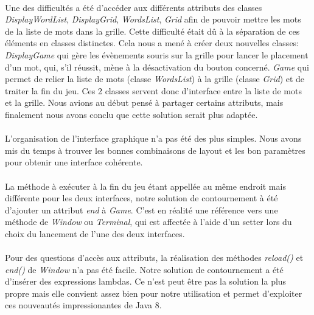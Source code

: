 \documentclass{article}
\begin{document}
\paragraph{} Une des difficultés a été d'accéder aux différents attributs des classes \textit{DisplayWordList}, \textit{DisplayGrid}, \textit{WordsList}, \textit{Grid} afin de pouvoir mettre les mots de la liste de mots dans la grille.
Cette difficulté était dû à la séparation de ces éléments en classes distinctes. Cela nous a mené à créer deux nouvelles classes:
\textit{DisplayGame} qui gère les évènements souris sur la grille pour lancer le placement d'un mot, qui, s'il réussit, mène à la désactivation du bouton concerné.
\textit{Game} qui permet de relier la liste de mots (classe \textit{WordsList}) à la grille (classe \textit{Grid}) et de traiter la fin du jeu.
Ces 2 classes servent donc d'interface entre la liste de mots et la grille.
Nous avions au début pensé à partager certains attributs, mais finalement nous avons conclu que cette solution serait plus adaptée.

\paragraph{} L'organisation de l'interface graphique n'a pas été des plus simples. Nous avons mis du temps à trouver les bonnes combinaisons de layout et les bon paramètres pour obtenir une interface cohérente.

\paragraph{} La méthode à exécuter à la fin du jeu étant appellée au même endroit mais différente pour les deux interfaces, notre solution de contournement à été d'ajouter un attribut \textit{end} à \textit{Game}. C'est en réalité une référence vers une méthode de \textit{Window} ou \textit{Terminal}, qui est affectée à l'aide d'un setter lors du choix du lancement de l'une des deux interfaces.

\paragraph{} Pour des questions d'accès aux attributs, la réalisation des méthodes \textit{reload()} et \textit{end()} de \textit{Window} n'a pas été facile. Notre solution de contournement a été d'insérer des expressions lambdas. Ce n'est peut être pas la solution la plus propre mais elle convient assez bien pour notre utilisation et permet d'exploiter ces nouveautés impressionantes de Java 8.
\end{document}

